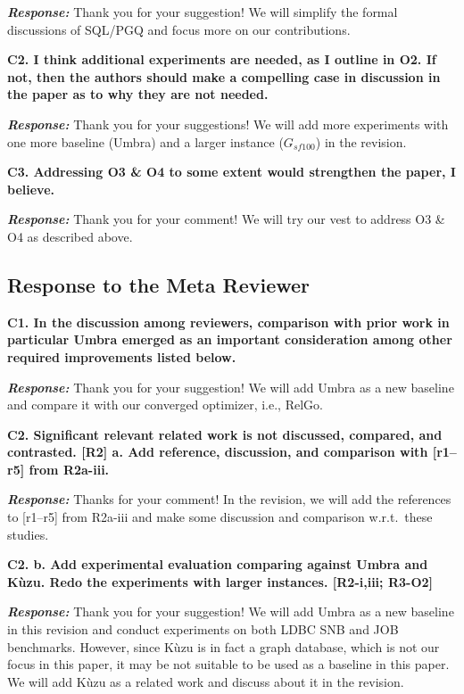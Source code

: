 \textbf{\textit{Response: }}
Thank you for your suggestion! We will simplify the formal discussions of SQL/PGQ and focus more on our contributions.


\textbf{
C2. I think additional experiments are needed, as I outline in O2. If not, then the authors should make a compelling case in discussion in the paper as to why they are not needed.}

\textbf{\textit{Response: }}
Thank you for your suggestions! We will add more experiments with one more baseline (Umbra) and a larger instance ($G_{sf100}$) in the revision.


\textbf{
C3. Addressing O3 \& O4 to some extent would strengthen the paper, I believe.}

\textbf{\textit{Response: }}
Thank you for your comment! We will try our vest to address O3 \& O4 as described above. 

\subsection{Response to the Meta Reviewer}

\textbf{
C1. In the discussion among reviewers, comparison with prior work in particular Umbra emerged as an important consideration among other required improvements listed below.}

\textbf{\textit{Response: }}
Thank you for your suggestion! We will add Umbra as a new baseline and compare it with our converged optimizer, i.e., RelGo.


\textbf{
C2. Significant relevant related work is not discussed, compared, and contrasted. [R2]
a. Add reference, discussion, and comparison with [r1–r5] from R2a-iii.
}

\textbf{\textit{Response: }}
Thanks for your comment! In the revision, we will add the references to [r1--r5] from R2a-iii and make some discussion and comparison w.r.t.~these studies.


\textbf{C2. b. Add experimental evaluation comparing against Umbra and Kùzu. Redo the experiments with larger instances. [R2-i,iii; R3-O2]}

\textbf{\textit{Response: }}
Thank you for your suggestion! We will add Umbra as a new baseline in this revision and conduct experiments on both LDBC SNB and JOB benchmarks. 
However, since Kùzu is in fact a graph database, which is not our focus in this paper, it may be not suitable to be used as a baseline in this paper.
We will add Kùzu as a related work and discuss about it in the revision.

